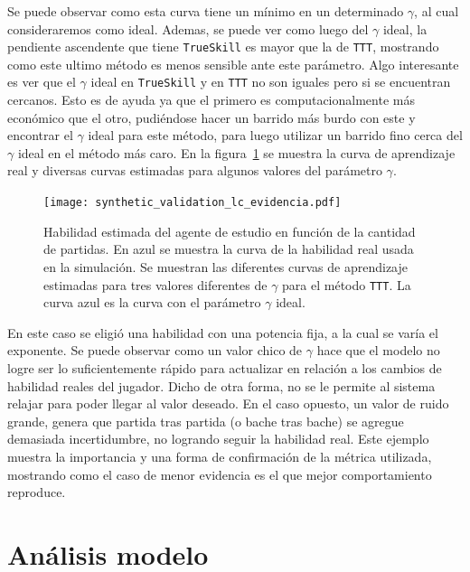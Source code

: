 \documentclass[11pt,twoside,spanish]{report} %
\begin{document}
Se puede observar como esta curva tiene un m\'inimo en un determinado $\gamma$, al cual consideraremos como ideal.
Ademas, se puede ver como luego del $\gamma$ ideal, la pendiente ascendente que tiene \texttt{TrueSkill} es mayor que la de \texttt{TTT}, mostrando como este ultimo m\'etodo es menos sensible ante este par\'ametro.
Algo interesante es ver que el $\gamma$ ideal en \texttt{TrueSkill} y en \texttt{TTT} no son iguales pero si se encuentran cercanos.
Esto es de ayuda ya que el primero es computacionalmente m\'as econ\'omico que el otro, pudi\'endose hacer un barrido m\'as burdo con este y encontrar el $\gamma$ ideal para este m\'etodo, para luego utilizar un barrido fino cerca del $\gamma$ ideal en el m\'etodo m\'as caro.
En la figura~\ref{fig:lcVSevi} se muestra la curva de aprendizaje real y diversas curvas estimadas para algunos valores del par\'ametro $\gamma$.

\begin{figure}[H]
	\centering
	\texttt{[image: synthetic\_validation\_lc\_evidencia.pdf]}
	\caption{Habilidad estimada del agente de estudio en funci\'on de la cantidad de partidas.
	En azul se muestra la curva de la habilidad real usada en la simulaci\'on.
	Se muestran las diferentes curvas de aprendizaje estimadas para tres valores diferentes de $\gamma$ para el m\'etodo \texttt{TTT}.
	La curva azul es la curva con el par\'ametro $\gamma$ ideal.}
	\label{fig:lcVSevi}
\end{figure}

En este caso se eligi\'o una habilidad con una potencia fija, a la cual se var\'ia el exponente.
Se puede observar como un valor chico de $\gamma$ hace que el modelo no logre ser lo suficientemente r\'apido para actualizar en relaci\'on a los cambios de habilidad reales del jugador.
Dicho de otra forma, no se le permite al sistema relajar para poder llegar al valor deseado.
En el caso opuesto, un valor de ruido grande, genera que partida tras partida (o bache tras bache) se agregue demasiada incertidumbre, no logrando seguir la habilidad real.
Este ejemplo muestra la importancia y una forma de confirmaci\'on de la m\'etrica utilizada, mostrando como el caso de menor evidencia es el que mejor comportamiento reproduce.

\section{An\'alisis modelo}\label{sec:analisisModelo} 
\end{document}
